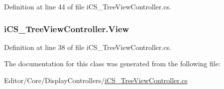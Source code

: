 Definition at line 44 of file i\+C\+S\+\_\+\+Tree\+View\+Controller.\+cs.

\hypertarget{classi_c_s___tree_view_controller_a911b3c95ec9b595a51c4b42df1c4533c}{
\subsubsection[{View}]{ i\+C\+S\+\_\+\+Tree\+View\+Controller.\+View\hspace{0.3cm}{\ttfamily [get]}}}\label{classi_c_s___tree_view_controller_a911b3c95ec9b595a51c4b42df1c4533c}


Definition at line 38 of file i\+C\+S\+\_\+\+Tree\+View\+Controller.\+cs.



The documentation for this class was generated from the following file\+:\begin{DoxyCompactItemize}
\item 
Editor/\+Core/\+Display\+Controllers/\hyperlink{i_c_s___tree_view_controller_8cs}{i\+C\+S\+\_\+\+Tree\+View\+Controller.\+cs}\end{DoxyCompactItemize}
